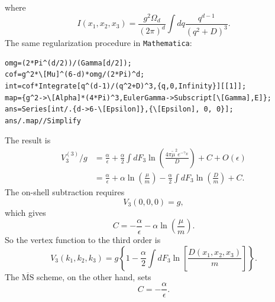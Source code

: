 where
\begin{equation*}
I(x_1,x_2,x_3) = \frac{g^2 \Omega_d}{(2\pi)^d} \int dq \frac{q^{d-1}}{(q^2+D)^3}.
\end{equation*}
The same regularization procedure in \texttt{Mathematica}:
\begin{lstlisting}[style=mathematicaFrameTB]
omg=(2*Pi^(d/2))/(Gamma[d/2]);
cof=g^2*\[Mu]^(6-d)*omg/(2*Pi)^d;
int=cof*Integrate[q^(d-1)/(q^2+D)^3,{q,0,Infinity}][[1]];
map={g^2->\[Alpha]*(4*Pi)^3,EulerGamma->Subscript[\[Gamma],E]};
ans=Series[int/.{d->6-\[Epsilon]},{\[Epsilon], 0, 0}];
ans/.map//Simplify
\end{lstlisting}
The result is
\begin{equation}
\begin{aligned}
	V_3^{(3)}/g 
	&= \frac{\alpha}{\epsilon}
	+ \frac{\alpha}{2}\int dF_3 \ln\left(\frac{4\pi\tilde{\mu}^2e^{-\gamma_E}}{D}\right) 
	+ C + O(\epsilon) \\
	&= \frac{\alpha}{\epsilon}
	+ \alpha\ln\left(\frac{\mu}{m}\right)
	- \frac{\alpha}{2}\int dF_3 \ln\left(\frac{D}{m}\right)
	+C.
\end{aligned}
\end{equation}
The on-shell subtraction requires 
\begin{equation}
V_3(0,0,0) = g,
\end{equation}
which gives
\begin{equation}
	C = -\frac{\alpha}{\epsilon}-\alpha \ln\left(\frac{\mu}{m}\right).
\end{equation}
So the vertex function to the third order is
\begin{equation}
	V_3(k_1,k_2,k_3) = g\left\{1-\frac{\alpha}{2} \int dF_3 \ln\left[\frac{D(x_1,x_2,x_3)}{m}\right] \right\}.
\end{equation}
The $\overline{\mathrm{MS}}$ scheme, on the other hand, sets
\begin{equation}
	C = -\frac{\alpha}{\epsilon}.
\end{equation}



